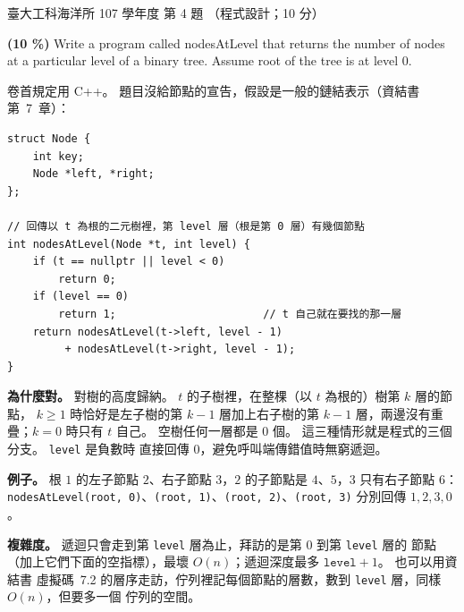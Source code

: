 \begin{pastexam}[label={px:ntu-107-esoe-ds-04}]{臺大工科海洋所 107 學年度 第 4 題}
（程式設計；10 分）

\textbf{(10 \%)} Write a program called \textsf{nodesAtLevel} that returns the number of nodes at a
particular level of a binary tree. Assume root of the tree is at level 0.
\end{pastexam}

\begin{pastsoln}
卷首規定用 C++。 題目沒給節點的宣告，假設是一般的鏈結表示（資結書第~7~章）：
\begin{verbatim}
struct Node {
    int key;
    Node *left, *right;
};

// 回傳以 t 為根的二元樹裡，第 level 層（根是第 0 層）有幾個節點
int nodesAtLevel(Node *t, int level) {
    if (t == nullptr || level < 0)
        return 0;
    if (level == 0)
        return 1;                       // t 自己就在要找的那一層
    return nodesAtLevel(t->left, level - 1)
         + nodesAtLevel(t->right, level - 1);
}
\end{verbatim}

\textbf{為什麼對。} 對樹的高度歸納。 $t$ 的子樹裡，在整棵（以 $t$ 為根的）樹第 $k$ 層的節點，
$k \ge 1$ 時恰好是左子樹的第 $k - 1$ 層加上右子樹的第 $k - 1$ 層，兩邊沒有重疊；$k = 0$ 時只有
$t$ 自己。 空樹任何一層都是 $0$ 個。 這三種情形就是程式的三個分支。 \texttt{level} 是負數時
直接回傳 $0$，避免呼叫端傳錯值時無窮遞迴。

\textbf{例子。} 根 $1$ 的左子節點 $2$、右子節點 $3$，$2$ 的子節點是 $4$、$5$，$3$ 只有右子節點
$6$：\texttt{nodesAtLevel(root, 0)}、\texttt{(root, 1)}、\texttt{(root, 2)}、\texttt{(root, 3)}
分別回傳 $1, 2, 3, 0$。

\textbf{複雜度。} 遞迴只會走到第 \texttt{level} 層為止，拜訪的是第 $0$ 到第 \texttt{level} 層的
節點（加上它們下面的空指標），最壞 $O(n)$；遞迴深度最多 $\texttt{level} + 1$。 也可以用資結書
虛擬碼~7.2 的層序走訪，佇列裡記每個節點的層數，數到 \texttt{level} 層，同樣 $O(n)$，但要多一個
佇列的空間。
\end{pastsoln}
